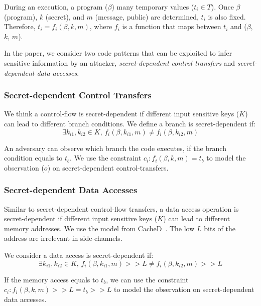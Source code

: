 During an execution, a program ($\beta$)  many temporary values ($t_i \in
T$). Once $\beta$ (program), $k$ (secret), and $m$ (message, public) are
determined, $t_i$ is also fixed. Therefore, $ t_i = f_i(\beta, k, m)$, where $f_
i$ is a function that maps between $t_i$ and ($\beta$, $k$, $m$).

In the paper, we consider two code patterns that can be exploited to infer sensitive information
 by an attacker,
\emph{secret-dependent control transfers} and \emph{secret-dependent data
accesses}. 

\subsubsection{Secret-dependent Control Transfers}
We think a control-flow is secret-dependent if different input sensitive keys
($K$) can lead to different branch conditions. 
We define a branch is secret-dependent if:
$$\exists k_{i1}, k_{i2} \in K, \,f_i(\beta, k_{i1}, m) \neq f_i(\beta, k_{i2}, m)$$

An adversary can observe which branch the code executes, if the branch condition
equals to $t_b$. We use the constraint $c_i : f_i(\beta, k, m) = t_b$ to model
the observation ($o$) on secret-dependent control-transfers.

\subsubsection{Secret-dependent Data Accesses}
Similar to secret-dependent control-flow transfers, a data access operation is
secret-dependent if different input sensitive keys ($K$) can lead to different
memory addresses. We use the model from CacheD~\cite{203878}. The low $L$ bits
of the address are irrelevant in side-channels.

We consider a data access is secret-dependent if:
$$\exists k_{i1}, k_{i2} \in K, \,f_i(\beta, k_{i1}, m) >> L \neq f_i(\beta, k_{i2}, m) >> L$$

If the memory access equals to $t_b$, we can use the constraint $c_i :
f_i(\beta, k, m) >> L = t_b >> L$ to model the observation on secret-dependent
data accesses.

